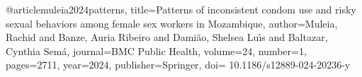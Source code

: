 @article{muleia2024patterns,
  title={Patterns of inconsistent condom use and risky sexual behaviors among female sex workers in Mozambique},
  author={Muleia, Rachid and Banze, Auria Ribeiro and Dami{\~a}o, Shelsea Lu{\'\i}s and Baltazar, Cynthia Sem{\'a}},
  journal={BMC Public Health},
  volume={24},
  number={1},
  pages={2711},
  year={2024},
  publisher={Springer},
doi= {10.1186/s12889-024-20236-y}
}